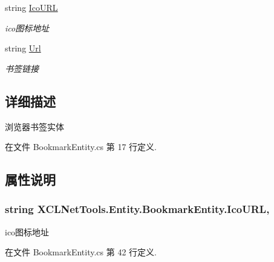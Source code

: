 \begin{DoxyCompactItemize}
string \hyperlink{class_x_c_l_net_tools_1_1_entity_1_1_bookmark_entity_af370dbfd32e8cde501e305c6999c077b}{Ico\-U\-R\-L}
\begin{DoxyCompactList}\small\item\em ico图标地址 \end{DoxyCompactList}\item 
string \hyperlink{class_x_c_l_net_tools_1_1_entity_1_1_bookmark_entity_a88ebfe2441fd5804a82f5eaee1ce3232}{Url}
\begin{DoxyCompactList}\small\item\em 书签链接 \end{DoxyCompactList}\end{DoxyCompactItemize}


\subsection{详细描述}
浏览器书签实体 



在文件 Bookmark\-Entity.\-cs 第 17 行定义.



\subsection{属性说明}
\hypertarget{class_x_c_l_net_tools_1_1_entity_1_1_bookmark_entity_af370dbfd32e8cde501e305c6999c077b}{
\subsubsection[{Ico\-U\-R\-L}]{\setlength{\rightskip}{0pt plus 5cm}string X\-C\-L\-Net\-Tools.\-Entity.\-Bookmark\-Entity.\-Ico\-U\-R\-L\hspace{0.3cm}{\ttfamily [get]}, {\ttfamily [set]}}}\label{class_x_c_l_net_tools_1_1_entity_1_1_bookmark_entity_af370dbfd32e8cde501e305c6999c077b}


ico图标地址 



在文件 Bookmark\-Entity.\-cs 第 42 行定义.

